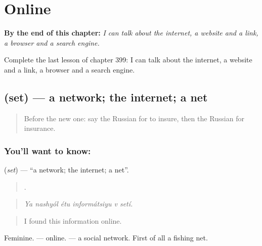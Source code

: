 
\chapter{Online}
\label{ch:ru-online}

\begin{chapteropening}
\textbf{By the end of this chapter:} \emph{I can talk about the internet, a website and a link, a browser and a search engine.}

Complete the last lesson of chapter 399: I can talk about the internet, a website and a link, a browser and a search engine.
\end{chapteropening}

\section[\texorpdfstring{\ru{сеть} (set)}{сеть (set)}]{ (set) — a network; the internet; a net}

\label{lesson:RU-C399-set}



\begin{quote}
Before the new one: say the Russian for to insure, then the Russian for insurance.
\end{quote}

\subsection*{You'll want to know: }
\textbf{} (\emph{set}) — \textquotedblleft{}a network; the internet; a net\textquotedblright{}.

\begin{quote}
     .
\end{quote}

\begin{quote}
\emph{Ya nashyól étu informátsiyu v setí.}
\end{quote}

\begin{quote}
I found this information online.
\end{quote}

Feminine. \emph{ } — online. \emph{ } — a social network. First of all a fishing net.

